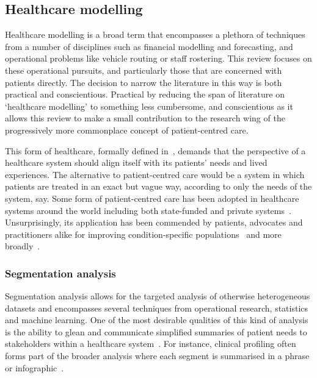 \subsection{Healthcare modelling}

Healthcare modelling is a broad term that encompasses a plethora of techniques
from a number of disciplines such as financial modelling and forecasting, and
operational problems like vehicle routing or staff rostering. This review
focuses on these operational pursuits, and particularly those that are concerned
with patients directly. The decision to narrow the literature in this way is
both practical and conscientious. Practical by reducing the span of literature
on `healthcare modelling' to something less cumbersome, and conscientious as it
allows this review to make a small contribution to the research wing of the
progressively more commonplace concept of patient-centred care.

This form of healthcare, formally defined in~\cite{Robinson2008}, demands that
the perspective of a healthcare system should align itself with its patients'
needs and lived experiences. The alternative to patient-centred care would be a
system in which patients are treated in an exact but vague way, according to
only the needs of the system, say. Some form of patient-centred care has been
adopted in healthcare systems around the world including both state-funded and
private systems~\cite{DoH2010,Dewi2013,Luxford2011}. Unsurprisingly, its
application has been commended by patients, advocates and practitioners alike
for improving condition-specific
populations~\cite{Foster2019,Gambling2010,Gondek2016,Tsianakas2012} and more
broadly~\cite{IAPO2012,Richards2015,Santana2019}.

\subsubsection{Segmentation analysis}

Segmentation analysis allows for the targeted analysis of otherwise
heterogeneous datasets and encompasses several techniques from operational
research, statistics and machine learning. One of the most desirable qualities
of this kind of analysis is the ability to glean and communicate simplified
summaries of patient needs to stakeholders within a healthcare
system~\cite{Vuik2016b, Yoon2020}. For instance, clinical profiling often forms
part of the broader analysis where each segment is summarised in a phrase or
infographic~\cite{Vuik2016a,Yan2019}.

